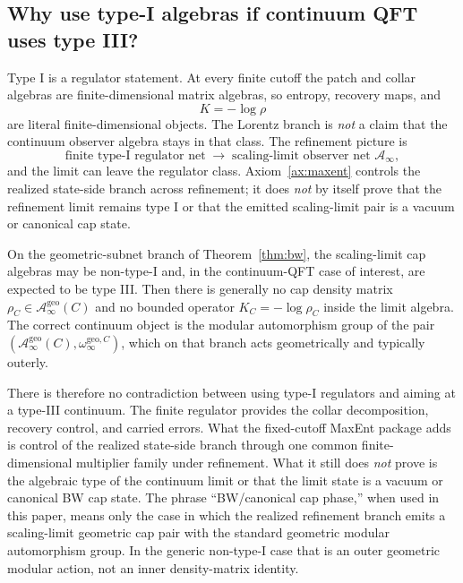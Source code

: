 \documentclass[11pt]{article}
\begin{document}
\subsection{Why use type-I algebras if continuum QFT uses type III?}

Type I is a regulator statement. At every finite cutoff the patch and collar algebras are finite-dimensional matrix algebras, so entropy, recovery maps, and
\[
K=-\log\rho
\]
are literal finite-dimensional objects. The Lorentz branch is \emph{not} a claim that the continuum observer algebra stays in that class. The refinement picture is
\[
\text{finite type-I regulator net}
\;\longrightarrow\;
\text{scaling-limit observer net } \mathcal A_\infty,
\]
and the limit can leave the regulator class. Axiom~\ref{ax:maxent} controls the realized state-side branch across refinement; it does \emph{not} by itself prove that the refinement limit remains type I or that the emitted scaling-limit pair is a vacuum or canonical cap state.

On the geometric-subnet branch of Theorem~\ref{thm:bw}, the scaling-limit cap algebras may be non-type-I and, in the continuum-QFT case of interest, are expected to be type III. Then there is generally no cap density matrix \(\rho_C\in \mathcal A_\infty^{\mathrm{geo}}(C)\) and no bounded operator \(K_C=-\log\rho_C\) inside the limit algebra. The correct continuum object is the modular automorphism group of the pair \((\mathcal A_\infty^{\mathrm{geo}}(C),\omega_\infty^{\mathrm{geo},C})\), which on that branch acts geometrically and typically outerly.

There is therefore no contradiction between using type-I regulators and aiming at a type-III continuum. The finite regulator provides the collar decomposition, recovery control, and carried errors. What the fixed-cutoff MaxEnt package adds is control of the realized state-side branch through one common finite-dimensional multiplier family under refinement. What it still does \emph{not} prove is the algebraic type of the continuum limit or that the limit state is a vacuum or canonical BW cap state. The phrase ``BW/canonical cap phase,'' when used in this paper, means only the case in which the realized refinement branch emits a scaling-limit geometric cap pair with the standard geometric modular automorphism group. In the generic non-type-I case that is an outer geometric modular action, not an inner density-matrix identity.
\end{document}
